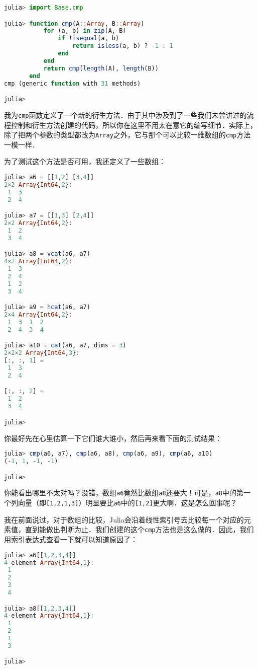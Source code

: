 \begin{lstlisting}[language=julia]
julia> import Base.cmp

julia> function cmp(A::Array, B::Array)
           for (a, b) in zip(A, B)
               if !isequal(a, b)
                   return isless(a, b) ? -1 : 1
               end
           end
           return cmp(length(A), length(B))
       end
cmp (generic function with 31 methods)

julia>
\end{lstlisting}

我为\verb|cmp|函数定义了一个新的衍生方法．由于其中涉及到了一些我们未曾讲过的流程控制和衍生方法创建的代码，所以你在这里不用太在意它的编写细节．实际上，除了把两个参数的类型都改为\verb|Array|之外，它与那个可以比较一维数组的\verb|cmp|方法一模一样．

为了测试这个方法是否可用，我还定义了一些数组：

\begin{lstlisting}[language=julia]
julia> a6 = [[1,2] [3,4]]
2×2 Array{Int64,2}:
 1  3
 2  4

julia> a7 = [[1,3] [2,4]]
2×2 Array{Int64,2}:
 1  2
 3  4

julia> a8 = vcat(a6, a7)
4×2 Array{Int64,2}:
 1  3
 2  4
 1  2
 3  4

julia> a9 = hcat(a6, a7)
2×4 Array{Int64,2}:
 1  3  1  2
 2  4  3  4

julia> a10 = cat(a6, a7, dims = 3)
2×2×2 Array{Int64,3}:
[:, :, 1] =
 1  3
 2  4

[:, :, 2] =
 1  2
 3  4

julia> 
\end{lstlisting}

你最好先在心里估算一下它们谁大谁小，然后再来看下面的测试结果：

\begin{lstlisting}[language=julia]
julia> cmp(a6, a7), cmp(a6, a8), cmp(a6, a9), cmp(a6, a10)
(-1, 1, -1, -1)

julia> 
\end{lstlisting}

你能看出哪里不太对吗？没错，数组\verb|a6|竟然比数组\verb|a8|还要大！可是，\verb|a8|中的第一个列向量（即\verb|[1,2,1,3]|）明显要比\verb|a6|中的\verb|[1,2]|更大啊．这是怎么回事呢？

我在前面说过，对于数组的比较，Julia会沿着线性索引号去比较每一个对应的元素值，直到能做出判断为止．我们创建的这个\verb|cmp|方法也是这么做的．因此，我们用索引表达式查看一下就可以知道原因了：

\begin{lstlisting}[language=julia]
julia> a6[[1,2,3,4]]
4-element Array{Int64,1}:
 1
 2
 3
 4

julia> a8[[1,2,3,4]]
4-element Array{Int64,1}:
 1
 2
 1
 3

julia>
\end{lstlisting}

